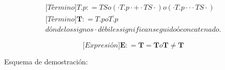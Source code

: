 \begin{enumerate}
\begin{enumerate}
\begin{enumerate}
\begin{enumerate}
        \[\begin{matrix}
        {{\lbrack\mathbf{\mathit{Término}}\rbrack}\mathbf{\mathit{T.p}}{: =}\mathbf{\mathit{TS}}o\left( {{{{\cdot \mathbf{\mathit{T.p}}} \cdot \mathbf{+}} \cdot \mathbf{\mathit{TS}}} \cdot} \right)o\left( {{{{\cdot \mathbf{\mathit{T.p}}} \cdot \mathbf{\mathrm{\cdot}}} \cdot \mathbf{\mathit{TS}}} \cdot} \right)} \\
        {{\lbrack\mathbf{\mathit{Término}}\rbrack}\mathbf{T}{: =}\mathbf{\mathit{T.p}}o\overline{\mathbf{\mathit{T.p}}}} \\
        {\mathit{dónde}\mathit{los}\mathit{signos} \cdot \mathit{débiles}\mathit{significan}\mathit{seguido}ó\mathit{concatenado.}}
        \end{matrix}\]

        \[{\lbrack\mathbf{\mathit{Expresión}}\rbrack}\mathbf{E}{: =}\mathbf{T{=}T}o\mathbf{T{\neq}T}\]

        Esquema de demostración:


\end{enumerate}
\end{enumerate}
\end{enumerate}
\end{enumerate}
